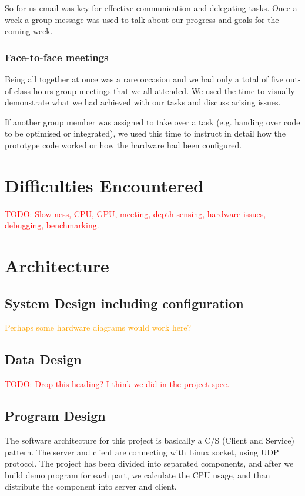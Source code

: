 \documentclass[11pt,a4paper,titlepage]{report}
\begin{document}
So for us email was key for effective communication and delegating tasks. Once a week a group message was used to talk about our progress and goals for the coming week.

\subsubsection{Face-to-face meetings}

Being all together at once was a rare occasion and we had only a total of five out-of-class-hours group meetings that we all attended. We used the time to visually demonstrate what we had achieved with our tasks and discuss arising issues. 

If another group member was assigned to take over a task (e.g. handing over code to be optimised or integrated), we used this time to instruct in detail how the prototype code worked or how the hardware had been configured. 

\section{Difficulties Encountered}

\textcolor{red}{TODO: Slow-ness, CPU, GPU, meeting, depth sensing, hardware issues, debugging, benchmarking.}


\section{Architecture}
\subsection{System Design including configuration}

\textcolor{orange}{Perhaps some hardware diagrams would work here?}

\subsection{Data Design}

\textcolor{red}{TODO: Drop this heading? I think we did in the project spec.}

\subsection{Program Design}


The software architecture for this project is basically a C/S (Client and Service) pattern. The server and client are connecting with Linux socket, using UDP protocol. The project has been divided into separated components, and after we build demo program for each part, we calculate the CPU usage, and than distribute the component into server and client.
\end{document}
